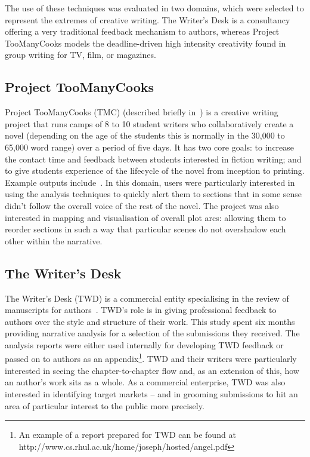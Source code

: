 \documentclass{article}
\begin{document}
The use of these techniques was evaluated in two domains, which were selected to represent the extremes of creative writing. The Writer's Desk is a consultancy offering a very traditional feedback mechanism to authors, whereas Project TooManyCooks  models the deadline-driven high intensity creativity found in group writing for TV, film, or magazines.  



\subsection{Project TooManyCooks}
Project TooManyCooks (TMC) (described briefly in~\cite{murtagh2011}) is a creative writing project that runs camps of 8 to 10 student writers who collaboratively create a novel (depending on the age of the students this is normally in the 30,000 to 65,000 word range) over a period of five days. It has two core goals: to  increase the contact time and feedback between students interested in fiction writing; and to give students experience of the  lifecycle of the novel from inception to printing.  Example outputs include~\cite{TMCdelivery,TMCdeception,TMCplaying,TMCroad}.  In this domain, users  were particularly interested in using the analysis techniques to quickly alert them to sections that in some sense didn't follow the overall voice of the rest of the novel.  The project was also interested in mapping and visualisation of overall plot arcs: allowing them to reorder sections in such a way that particular scenes do not overshadow each other within the narrative.  


\subsection{The Writer's Desk} 
The Writer's Desk (TWD) is a commercial entity specialising in the review of manuscripts for authors~\cite{twd}.  TWD's role is in giving professional feedback to authors over the style and structure of their work.  This study spent six months providing narrative analysis for a selection of the submissions they received.  The analysis reports were either used internally for developing TWD feedback or passed on to authors as an appendix\footnote{An example of a report prepared for TWD can be found at http://www.cs.rhul.ac.uk/home/joseph/hosted/angel.pdf}.   TWD and their writers  were particularly interested in seeing the chapter-to-chapter flow and, as an extension of this, how an author's work sits as a whole.  As a commercial enterprise, TWD was also interested in identifying target markets -- and in grooming submissions to  hit an area of particular interest to the public more precisely. 
\end{document}
